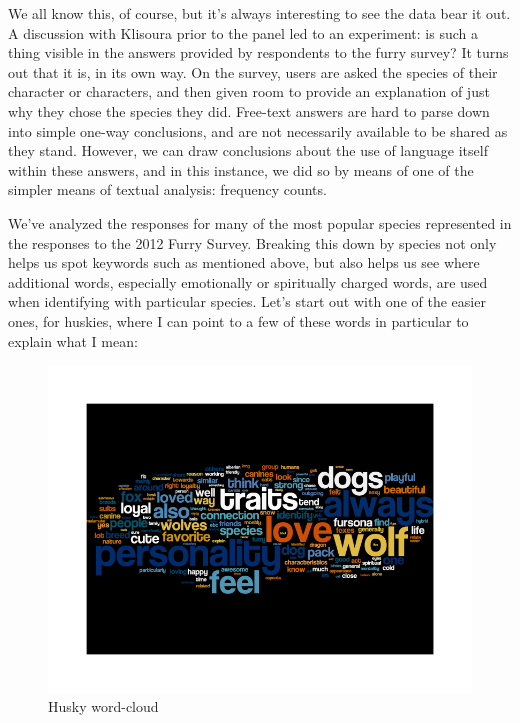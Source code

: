 We all know this, of course, but it's always interesting to see the data bear it out. A discussion with Klisoura prior to the panel led to an experiment: is such a thing visible in the answers provided by respondents to the furry survey? It turns out that it is, in its own way. On the survey, users are asked the species of their character or characters, and then given room to provide an explanation of just why they chose the species they did. Free-text answers are hard to parse down into simple one-way conclusions, and are not necessarily available to be shared as they stand. However, we can draw conclusions about the use of language itself within these answers, and in this instance, we did so by means of one of the simpler means of textual analysis: frequency counts.

We've analyzed the responses for many of the most popular species represented in the responses to the 2012 Furry Survey. Breaking this down by species not only helps us spot keywords such as mentioned above, but also helps us see where additional words, especially emotionally or spiritually charged words, are used when identifying with particular species. Let's start out with one of the easier ones, for huskies, where I can point to a few of these words in particular to explain what I mean:

\begin{figure}
  \begin{center}
    \includegraphics[width=\textwidth]{content/assets/species--husky}
  \end{center}
  \caption{Husky word-cloud}
\end{figure}

